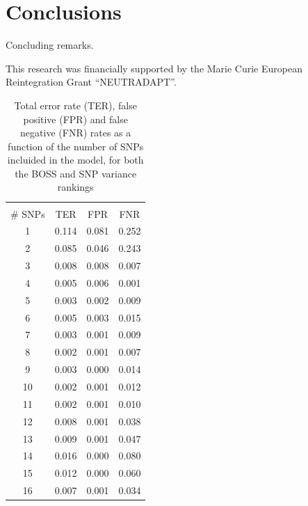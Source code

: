 \section{Conclusions}
\label{sec:conclusions}

Concluding remarks. 


\begin{acknowledgements}
This research was financially supported by the Marie Curie European
Reintegration Grant ``NEUTRADAPT''.
\end{acknowledgements}


\begin{table}
\centering
\caption{Total error rate (TER), false positive (FPR) and false negative
  (FNR) rates as a function of the number of SNPs incluided in the
  model, for both the BOSS and SNP variance rankings}
\label{tab:error}       %
\begin{tabular}{cccc}
\hline\noalign{\smallskip}
\multicolumn{4}{c}{BOSS}\\
\noalign{\smallskip}\hline\noalign{\smallskip}
\# SNPs & TER & FPR & FNR \\
\noalign{\smallskip}\hline\noalign{\smallskip}
1 & 0.114 & 0.081 & 0.252 \\
2 & 0.085 & 0.046 & 0.243 \\
3 & 0.008 & 0.008 &  0.007 \\
4 & 0.005 & 0.006 &  0.001 \\
5 & 0.003 & 0.002 &  0.009 \\
6 & 0.005 & 0.003&  0.015\\
7 & 0.003 & 0.001 &  0.009\\
8 & 0.002 & 0.001 &  0.007\\
9 & 0.003 & 0.000 &  0.014\\
10 & 0.002 & 0.001 &  0.012\\
11 & 0.002 & 0.001 &  0.010\\
12 & 0.008 & 0.001 &  0.038\\
13 & 0.009 & 0.001 &  0.047\\
14 & 0.016 & 0.000 &  0.080\\
15 & 0.012 & 0.000 &  0.060\\
16 & 0.007 & 0.001 &  0.034\\

\end{tabular}
\end{table}
